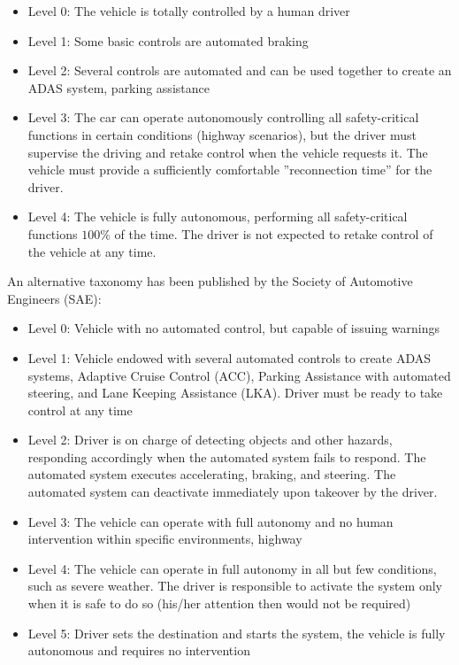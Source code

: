 \begin{itemize}
\item Level 0: The vehicle is totally controlled by a human driver
\item Level 1: Some basic controls are automated \eg braking
\item Level 2: Several controls are automated and can be used together to create an ADAS system, \eg parking assistance 
\item Level 3: The car can operate autonomously controlling all safety-critical functions in certain conditions (\eg highway scenarios), but the driver must supervise the driving and retake control when the vehicle requests it. The vehicle must provide a sufficiently comfortable ''reconnection time'' for the driver.
\item Level 4: The vehicle is fully autonomous, performing all safety-critical functions $100\%$ of the time. The driver is not expected to retake control of the vehicle at any time.
\end{itemize}

An alternative taxonomy has been published by the  Society of Automotive Engineers (SAE):

\begin{itemize}
\item Level 0: Vehicle with no automated control, but capable of issuing warnings
\item Level 1: Vehicle endowed with several automated controls to create ADAS systems, Adaptive Cruise Control (ACC), Parking Assistance with automated steering, and Lane Keeping Assistance (LKA). Driver must be ready to take control at any time
\item Level 2: Driver is on charge of detecting objects and other hazards, responding accordingly when the automated system fails to respond. The automated system executes accelerating, braking, and steering. The automated system can deactivate immediately upon takeover by the driver.
\item Level 3: The vehicle can operate with full autonomy and no human intervention within specific environments, \eg highway
\item Level 4: The vehicle can operate in full autonomy in all but few conditions, such as severe weather. The driver is responsible to activate the system only when it is safe to do so (his/her attention then would not be required)
\item Level 5: Driver sets the destination and starts the system, the vehicle is fully autonomous and requires no intervention
\end{itemize}

